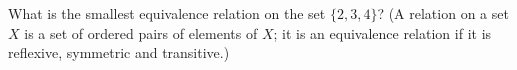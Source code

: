 What is the smallest equivalence relation on the set $\{2,3,4\}$? (A relation on a set $X$ is a set of ordered pairs of elements of $X$; it is an equivalence relation if it is reflexive, symmetric and transitive.)
